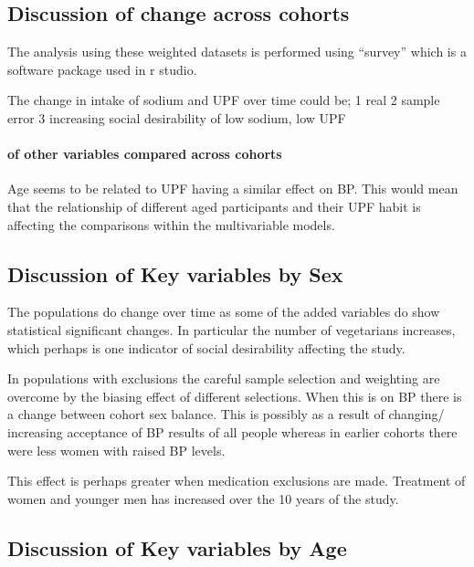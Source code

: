 \documentclass[
]{article}
\begin{document}
\hypertarget{discussion-of-change-across-cohorts}{%
\subsection{Discussion of change across
cohorts}\label{discussion-of-change-across-cohorts}}

The analysis using these weighted datasets is performed using ``survey''
which is a software package used in r studio.

The change in intake of sodium and UPF over time could be; 1 real 2
sample error 3 increasing social desirability of low sodium, low UPF

\hypertarget{of-other-variables-compared-across-cohorts}{%
\paragraph{of other variables compared across
cohorts}\label{of-other-variables-compared-across-cohorts}}

Age seems to be related to UPF having a similar effect on BP. This would
mean that the relationship of different aged participants and their UPF
habit is affecting the comparisons within the multivariable models.

\hypertarget{discussion-of-key-variables-by-sex}{%
\subsection{Discussion of Key variables by
Sex}\label{discussion-of-key-variables-by-sex}}

The populations do change over time as some of the added variables do
show statistical significant changes. In particular the number of
vegetarians increases, which perhaps is one indicator of social
desirability affecting the study.

In populations with exclusions the careful sample selection and
weighting are overcome by the biasing effect of different selections.
When this is on BP there is a change between cohort sex balance. This is
possibly as a result of changing/ increasing acceptance of BP results of
all people whereas in earlier cohorts there were less women with raised
BP levels.

This effect is perhaps greater when medication exclusions are made.
Treatment of women and younger men has increased over the 10 years of
the study.

\hypertarget{discussion-of-key-variables-by-age}{%
\subsection{Discussion of Key variables by
Age}\label{discussion-of-key-variables-by-age}}
\end{document}
